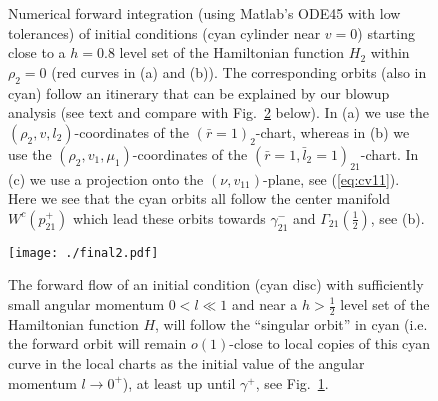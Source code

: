 \documentclass[reqno,12pt]{amsart}
\renewcommand{\eqref}[1]{(\ref{eq:#1})}
\newcommand{\figref}[1]{Fig.~\ref{fig:#1}}
\newcommand{\figlab}[1]{\label{fig:#1}}
\numberwithin{equation}{section}
\begin{document}
\begin{figure}[h!]
 	\begin{center}
 		\caption{Numerical forward integration (using Matlab's ODE45 with low tolerances) of initial conditions (cyan cylinder near $v=0$) starting close to a $h=0.8$ level set of the Hamiltonian function $H_2$ within $\rho_2=0$ (red curves in (a) and (b)). The corresponding orbits (also in cyan) follow an itinerary that can be explained by our blowup analysis (see text and compare with  \figref{final2} below). In (a) we use the $(\rho_2,v,l_2)$-coordinates of the $(\bar r=1)_2$-chart, whereas in (b) we use the $(\rho_2,v_1,\mu_1)$-coordinates of the $(\bar r=1,\bar l_2=1)_{21}$-chart. In (c) we use a projection onto the $(\nu,v_{11})$-plane, see \eqref{cv11}. Here we see that the cyan orbits all follow the center manifold $W^c(p_{21}^+)$ which lead these orbits towards $\gamma_{21}^-$ and $\Gamma_{21}\!\left(\frac12\right)$, see (b).}\figlab{simulation}
 	\end{center}
 \end{figure}


\begin{figure}[h!]
 	\begin{center}
 		{\texttt{[image: ./final2.pdf]}}
 		\caption{The forward flow of an initial condition (cyan disc) with sufficiently small angular momentum $0<l \ll 1$ and near a $h>\frac12$ level set of the Hamiltonian function $H$, will follow the ``singular orbit'' in cyan  (i.e. the forward orbit will remain $o(1)$-close to local copies of this cyan curve in the local charts as the initial value of the angular momentum $l\rightarrow 0^+$), at least up until $\gamma^+$, see \figref{simulation}.}\figlab{final2}
 	\end{center}
 \end{figure}
\end{document}

